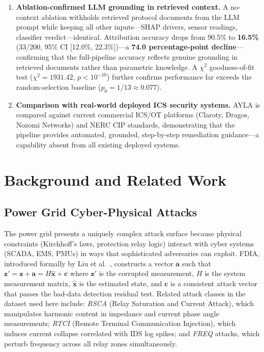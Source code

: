 \documentclass[twocolumn, 10pt, letterpaper]{article}
\begin{document}
\begin{enumerate}
    \item[\textbf{C4.}] \textbf{Ablation-confirmed LLM grounding in retrieved context.}
          A no-context ablation withholds retrieved protocol documents from the LLM
          prompt while keeping all other inputs---SHAP drivers, sensor readings,
          classifier verdict---identical.
          Attribution accuracy drops from 90.5\% to \textbf{16.5\%}
          (33/200, 95\% CI [12.0\%, 22.3\%])---a \textbf{74.0 percentage-point
          decline}---confirming that the full-pipeline accuracy reflects genuine
          grounding in retrieved documents rather than parametric knowledge.
          A $\chi^2$ goodness-of-fit test ($\chi^2 = 1931.42$, $p < 10^{-10}$)
          further confirms performance far exceeds the random-selection baseline
          ($p_0 = 1/13 \approx 0.077$).

    \item[\textbf{C5.}] \textbf{Comparison with real-world deployed ICS security systems.}
          AYLA is compared against current commercial ICS/OT platforms (Claroty,
          Dragos, Nozomi Networks) and NERC CIP standards, demonstrating that the
          pipeline provides automated, grounded, step-by-step remediation
          guidance---a capability absent from all existing deployed systems.
\end{enumerate}

\section{Background and Related Work}
\label{sec:background}

\subsection{Power Grid Cyber-Physical Attacks}

The power grid presents a uniquely complex attack surface because physical
constraints (Kirchhoff's laws, protection relay logic) interact with cyber systems
(SCADA, EMS, PMUs) in ways that sophisticated adversaries can exploit.
FDIA, introduced formally by Liu et al.\ \cite{liu2011fdia}, constructs a
vector $\mathbf{a}$ such that $\mathbf{z}' = \mathbf{z} + \mathbf{a} = H\hat{\mathbf{x}} + \mathbf{c}$
where $\mathbf{z}'$ is the corrupted measurement, $H$ is the system measurement
matrix, $\hat{\mathbf{x}}$ is the estimated state, and $\mathbf{c}$ is a
consistent attack vector that passes the bad-data detection residual test.
Related attack classes in the dataset used here include:
\textit{RSCA} (Relay Saturation and Current Attack), which manipulates
harmonic content in impedance and current phase angle measurements;
\textit{RTCI} (Remote Terminal Communication Injection), which induces current
collapse correlated with IDS log spikes; and
\textit{FREQ} attacks, which perturb frequency across all relay zones simultaneously.
\end{document}
